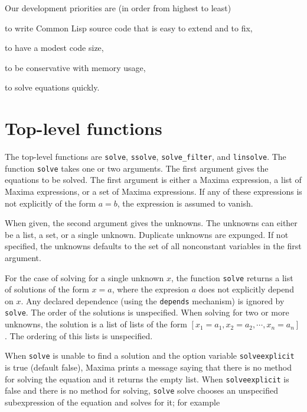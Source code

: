 \documentclass[]{scrartcl}
\begin{document}
\noindent Our development priorities are (in order from highest to least)

\begin{alphalist}[]

\item to write  Common Lisp source code that is easy to extend and to fix,

\item to have a modest code size,

\item to be conservative with memory usage,

\item to solve equations quickly.

\end{alphalist}

\section{Top-level functions}

The top-level functions are \texttt{solve}, \texttt{ssolve}, \texttt{solve\_filter},
and \texttt{linsolve}. The function \texttt{solve} takes  one or two arguments. The first
argument gives the equations to be solved. The first argument is either a Maxima expression,
a list of Maxima expressions, or a set of Maxima expressions. If any of these expressions is
not explicitly of the form \(a = b\), the expression is assumed to vanish.

When given, the second argument gives the unknowns. The unknowns can either be a list, a set, or
a single unknown. Duplicate unknowns are expunged. If not specified, the unknowns defaults to
the set of all nonconstant variables in the first argument.

For the case of solving for a single unknown \(x\), the function \texttt{solve} returns a list
of solutions of the form \(x = a\), where the expresion \(a\) does not explicitly depend on \(x\).
Any declared dependence (using the \texttt{depends} mechanism) is ignored by \texttt{solve}.
The order of the solutions is unspecified. When solving for two or more unknowns, the solution
is a list of lists of the form \([x_1 = a_1, x_2 = a_2, \cdots, x_n = a_n] \). The ordering of
this lists is unspecified.

When \texttt{solve} is unable to find a solution and the option variable \texttt{solveexplicit}
is true (default false), Maxima prints a message saying that there is no method for solving the
equation and it returns the empty list. When \texttt{solveexplicit} is false and there is no
method for solving, \texttt{solve} solve chooses an unspecified subexpression of the equation
and solves for it; for example
\end{document}
